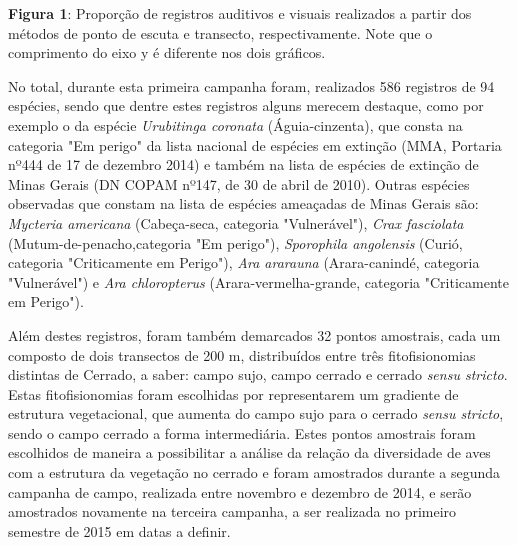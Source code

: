 \textbf{Figura 1}: Proporção de registros auditivos e visuais realizados a partir dos métodos de ponto de escuta e transecto, respectivamente. Note que o comprimento do eixo y é diferente nos dois gráficos.

No total, durante esta primeira campanha foram, realizados 586 registros de 94 espécies, sendo que dentre estes registros alguns merecem destaque, como por exemplo o da espécie \textit{Urubitinga coronata} (Águia-cinzenta), que consta na categoria "Em perigo" da lista nacional de espécies em extinção (MMA, Portaria nº444 de 17 de dezembro 2014) e também na lista de espécies de extinção de Minas Gerais (DN COPAM nº147, de 30 de abril de 2010). Outras espécies observadas que constam na lista de espécies ameaçadas de Minas Gerais são: \textit{Mycteria americana} (Cabeça-seca, categoria "Vulnerável"), \textit{Crax fasciolata} (Mutum-de-penacho,categoria "Em perigo"), \textit{Sporophila angolensis} (Curió, categoria "Criticamente em Perigo"), \textit{Ara ararauna}  (Arara-canindé, categoria "Vulnerável") e \textit{Ara chloropterus} (Arara-vermelha-grande, categoria "Criticamente em Perigo").

Além destes registros, foram também demarcados 32 pontos amostrais, cada um composto de dois transectos de 200 m, distribuídos entre três fitofisionomias distintas de Cerrado, a saber: campo sujo, campo cerrado e cerrado \textit{sensu stricto}. Estas fitofisionomias foram escolhidas por representarem um gradiente de estrutura vegetacional, que aumenta do campo sujo para o cerrado \textit{sensu stricto}, sendo o campo cerrado a forma intermediária. Estes pontos amostrais foram escolhidos de maneira a possibilitar a análise da relação da diversidade de aves com a estrutura da vegetação no cerrado e foram amostrados durante a segunda campanha de campo, realizada entre novembro e dezembro de 2014, e serão amostrados novamente na terceira campanha, a ser realizada no primeiro semestre de 2015 em datas a definir.


